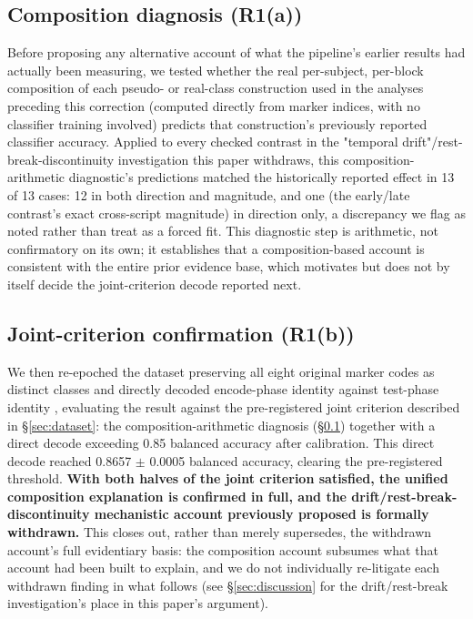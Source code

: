\documentclass[preprint,12pt]{elsarticle}
\begin{document}
\subsection{Composition diagnosis (R1(a))}\label{sec:r1a}

Before proposing any alternative account of what the pipeline's earlier results had actually been measuring, we tested whether the real per-subject, per-block composition of each pseudo- or real-class construction used in the analyses preceding this correction (computed directly from marker indices, with no classifier training involved) predicts that construction's previously reported classifier accuracy. Applied to every checked contrast in the "temporal drift"/rest-break-discontinuity investigation this paper withdraws, this composition-arithmetic diagnostic's predictions matched the historically reported effect in 13 of 13 cases: 12 in both direction and magnitude, and one (the early/late contrast's exact cross-script magnitude) in direction only, a discrepancy we flag as noted rather than treat as a forced fit. This diagnostic step is arithmetic, not confirmatory on its own; it establishes that a composition-based account is consistent with the entire prior evidence base, which motivates but does not by itself decide the joint-criterion decode reported next.

\subsection{Joint-criterion confirmation (R1(b))}\label{sec:r1b}

We then re-epoched the dataset preserving all eight original marker codes as distinct classes and directly decoded encode-phase identity against test-phase identity \cite{pallerkutas1992,curran2000}, evaluating the result against the pre-registered joint criterion described in \S\ref{sec:dataset}: the composition-arithmetic diagnosis (\S\ref{sec:r1a}) together with a direct decode exceeding 0.85 balanced accuracy after calibration. This direct decode reached 0.8657 $\pm$ 0.0005 balanced accuracy, clearing the pre-registered threshold. \textbf{With both halves of the joint criterion satisfied, the unified composition explanation is confirmed in full, and the drift/rest-break-discontinuity mechanistic account previously proposed is formally withdrawn.} This closes out, rather than merely supersedes, the withdrawn account's full evidentiary basis: the composition account subsumes what that account had been built to explain, and we do not individually re-litigate each withdrawn finding in what follows (see \S\ref{sec:discussion} for the drift/rest-break investigation's place in this paper's argument).
\end{document}
